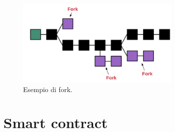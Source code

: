 \documentclass[a4paper,11pt]{report}
\begin{document}
\begin{figure}[htbp] 
\begin{center}
\includegraphics[width=8cm]{img/fork.png} 
\end{center}
\caption{Esempio di fork. \cite{genesis}}
\end{figure}

\chapter{Smart contract}
\end{document}
